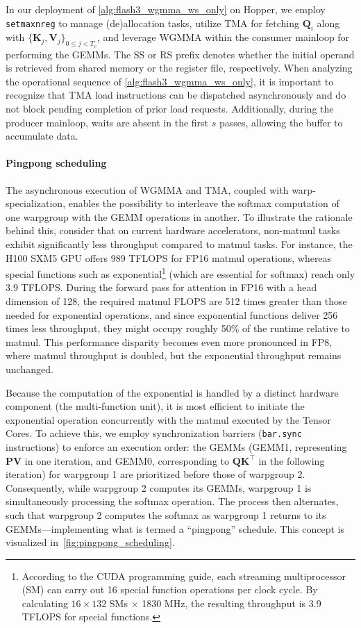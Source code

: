 In our deployment of \cref{alg:flash3_wgmma_ws_only} on Hopper, we employ \verb|setmaxnreg| to manage (de)allocation tasks, utilize TMA for fetching $\mathbf{Q}_i$ along with $\{ \mathbf{K}_j, \mathbf{V}_j \}_{0 \leq j < T_c}$, and leverage WGMMA within the consumer mainloop for performing the GEMMs. The SS or RS prefix denotes whether the initial operand is retrieved from shared memory or the register file, respectively. When analyzing the operational sequence of \cref{alg:flash3_wgmma_ws_only}, it is important to recognize that TMA load instructions can be dispatched asynchronously and do not block pending completion of prior load requests. Additionally, during the producer mainloop, waits are absent in the first $s$ passes, allowing the buffer to accumulate data.

\paragraph{Pingpong scheduling} The asynchronous execution of WGMMA and TMA, coupled with warp-specialization, enables the possibility to interleave the softmax computation of one warpgroup with the GEMM operations in another. To illustrate the rationale behind this, consider that on current hardware accelerators, non-matmul tasks exhibit significantly less throughput compared to matmul tasks. For instance, the H100 SXM5 GPU offers 989 TFLOPS for FP16 matmul operations, whereas special functions such as exponential\footnote{According to the CUDA programming guide, each streaming multiprocessor (SM) can carry out 16 special function operations per clock cycle. By calculating $16 \times 132$ SMs $\times$ 1830 MHz, the resulting throughput is 3.9 TFLOPS for special functions.} (which are essential for softmax) reach only 3.9 TFLOPS. During the forward pass for attention in FP16 with a head dimension of 128, the required matmul FLOPS are 512 times greater than those needed for exponential operations, and since exponential functions deliver 256 times less throughput, they might occupy roughly 50\% of the runtime relative to matmul. This performance disparity becomes even more pronounced in FP8, where matmul throughput is doubled, but the exponential throughput remains unchanged.

Because the computation of the exponential is handled by a distinct hardware component (the multi-function unit), it is most efficient to initiate the exponential operation concurrently with the matmul executed by the Tensor Cores. To achieve this, we employ synchronization barriers (\texttt{bar.sync} instructions) to enforce an execution order: the GEMMs (GEMM1, representing $\mathbf{P} \mathbf{V}$ in one iteration, and GEMM0, corresponding to $\mathbf{Q} \mathbf{K}^\top$ in the following iteration) for warpgroup 1 are prioritized before those of warpgroup 2. Consequently, while warpgroup 2 computes its GEMMs, warpgroup 1 is simultaneously processing the softmax operation. The process then alternates, such that warpgroup 2 computes the softmax as warpgroup 1 returns to its GEMMs—implementing what is termed a ``pingpong'' schedule. This concept is visualized in~\cref{fig:pingpong_scheduling}. 

